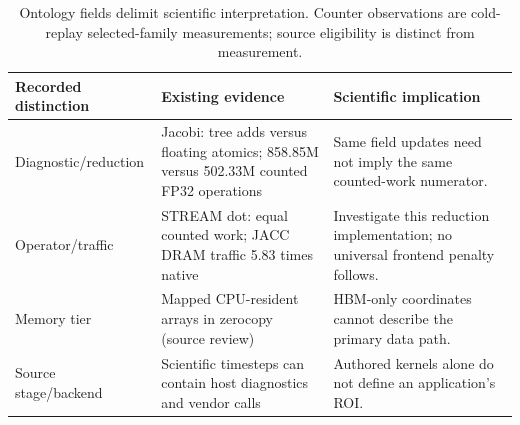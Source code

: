 \begin{table}[t]\centering\small
\caption{Ontology fields delimit scientific interpretation. Counter observations are cold-replay selected-family measurements; source eligibility is distinct from measurement.}
\begin{tabular}{p{}p{}p{}}
\hline
Recorded distinction & Existing evidence & Scientific implication\\\hline
Diagnostic/reduction & Jacobi: tree adds versus floating atomics; 858.85M versus 502.33M counted FP32 operations & Same field updates need not imply the same counted-work numerator.\\
Operator/traffic & STREAM dot: equal counted work; JACC DRAM traffic 5.83 times native & Investigate this reduction implementation; no universal frontend penalty follows.\\
Memory tier & Mapped CPU-resident arrays in zerocopy (source review) & HBM-only coordinates cannot describe the primary data path.\\
Source stage/backend & Scientific timesteps can contain host diagnostics and vendor calls & Authored kernels alone do not define an application's ROI.\\\hline
\end{tabular}
\end{table}
